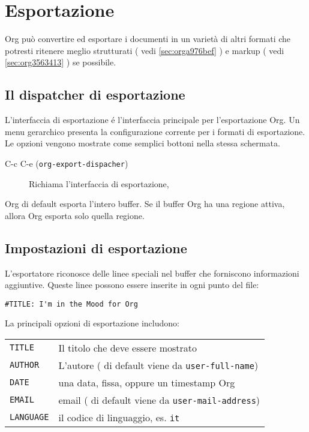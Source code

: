 \documentclass[11pt]{article}
\begin{document}
\section{Esportazione}
\label{sec:orgc8db748}
Org può convertire ed esportare i documenti in un varietà di altri
formati che potresti ritenere meglio strutturati ( vedi \ref{sec:orga976bef} ) e markup ( vedi \ref{sec:org3563413} ) se
possibile.

\subsection{Il dispatcher di esportazione}
\label{sec:org10d3efc}
L'interfaccia di esportazione é l'interfaccia principale per
l'esportazione Org. Un menu gerarchico presenta la configurazione
corrente per i formati di esportazione. Le opzioni vengono mostrate
come semplici bottoni nella stessa schermata.

\begin{description}
\item[{C-c C-e (\texttt{org-export-dispacher})}] Richiama l'interfaccia di esportazione,
\end{description}

Org di default esporta l'intero buffer. Se il buffer Org ha una
regione attiva, allora Org esporta solo quella regione.

\subsection{Impostazioni di esportazione}
\label{sec:org1416194}
L'esportatore riconosce delle linee speciali nel buffer che forniscono
informazioni aggiuntive. Queste linee possono essere inserite in ogni
punto del file:

\begin{verbatim}
#TITLE: I'm in the Mood for Org
\end{verbatim}


La principali opzioni di esportazione includono:

\begin{center}
\begin{tabular}{ll}
\texttt{TITLE} & Il titolo che deve essere mostrato\\[0pt]
\texttt{AUTHOR} & L'autore ( di default viene da \texttt{user-full-name})\\[0pt]
\texttt{DATE} & una data, fissa, oppure un timestamp Org\\[0pt]
\texttt{EMAIL} & email ( di default viene da \texttt{user-mail-address})\\[0pt]
\texttt{LANGUAGE} & il codice di linguaggio, es. \texttt{it}\\[0pt]
\end{tabular}
\end{center}
\end{document}
